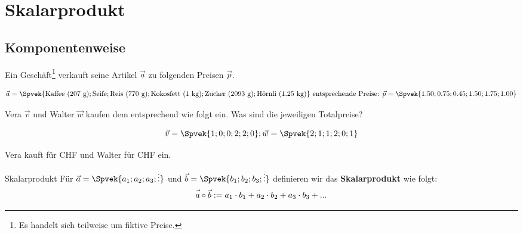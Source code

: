 \section{Skalarprodukt}




\subsection{Komponentenweise}


Ein Geschäft\footnote{Es handelt sich teilweise um fiktive Preise.} verkauft seine Artikel $\vec{a}$ zu folgenden Preisen $\vec{p}$.

$$
\vec{a} = \Spvek{\text{Kaffee (207 g)};\text{Seife}; \text{Reis (770
    g)}; \text{Kokosfett (1 kg)}; \text{Zucker (2093 g)};
\text{Hörnli (1.25 kg)}}
\text{ entsprechende Preise: }
\vec{p} = \Spvek{1.50; 0.75; 0.45; 1.50; 1.75; 1.00}
$$

Vera $\vec{v}$ und Walter $\vec{w}$ kaufen dem entsprechend wie folgt ein. Was sind die
jeweiligen Totalpreise?

$$\vec{v} = \Spvek{1;0;0;2;2;0}; \vec{w} = \Spvek{2;1;1;2;0;1} $$


\vspace{3mm}
Vera kauft für CHF  und Walter für CHF
 ein.

\newpage

\begin{definition}{Skalarprodukt}{}
Für $\vec{a} = \Spvek{a_1;a_2;a_3;\vdots}$ und
$\vec{b}=\Spvek{b_1;b_2;b_3;\vdots}$ definieren wir das
\textbf{Skalarprodukt} wie folgt:
  $$\vec{a\vphantom{b}}\circ\vec{b} := a_1\cdot{}b_1 + a_2 \cdot{} b_2
  + a_3\cdot{}b_3 + ...$$
\end{definition}

